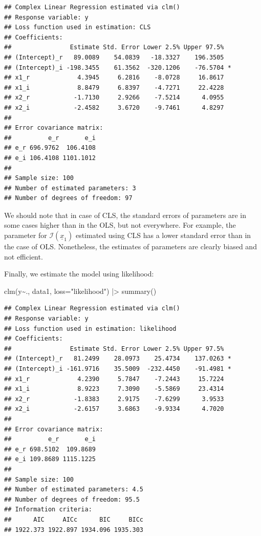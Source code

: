 \documentclass[
]{book}
\newenvironment{Shaded}{\begin{snugshade}}{\end{snugshade}}
\newcommand{\AttributeTok}[1]{\textcolor[rgb]{0.77,0.63,0.00}{#1}}
\newcommand{\FunctionTok}[1]{\textcolor[rgb]{0.00,0.00,0.00}{#1}}
\newcommand{\NormalTok}[1]{#1}
\newcommand{\SpecialCharTok}[1]{\textcolor[rgb]{0.00,0.00,0.00}{#1}}
\newcommand{\StringTok}[1]{\textcolor[rgb]{0.31,0.60,0.02}{#1}}
\begin{document}
\begin{verbatim}
## Complex Linear Regression estimated via clm()
## Response variable: y
## Loss function used in estimation: CLS
## Coefficients:
##                Estimate Std. Error Lower 2.5% Upper 97.5%  
## (Intercept)_r   89.0089    54.0839   -18.3327    196.3505  
## (Intercept)_i -198.3455    61.3562  -320.1206    -76.5704 *
## x1_r             4.3945     6.2816    -8.0728     16.8617  
## x1_i             8.8479     6.8397    -4.7271     22.4228  
## x2_r            -1.7130     2.9266    -7.5214      4.0955  
## x2_i            -2.4582     3.6720    -9.7461      4.8297  
## 
## Error covariance matrix:
##          e_r       e_i
## e_r 696.9762  106.4108
## e_i 106.4108 1101.1012
## 
## Sample size: 100
## Number of estimated parameters: 3
## Number of degrees of freedom: 97
\end{verbatim}

We should note that in case of CLS, the standard errors of parameters are in some cases higher than in the OLS, but not everywhere. For example, the parameter for \(\mathcal{I}\left(\underline{x}_{1}\right)\) estimated using CLS has a lower standard error than in the case of OLS. Nonetheless, the estimates of parameters are clearly biased and not efficient.

Finally, we estimate the model using likelihood:

\begin{Shaded}
\begin{Highlighting}[]
\FunctionTok{clm}\NormalTok{(y}\SpecialCharTok{\textasciitilde{}}\NormalTok{., data1, }\AttributeTok{loss=}\StringTok{"likelihood"}\NormalTok{) }\SpecialCharTok{|\textgreater{}}
    \FunctionTok{summary}\NormalTok{()}
\end{Highlighting}
\end{Shaded}

\begin{verbatim}
## Complex Linear Regression estimated via clm()
## Response variable: y
## Loss function used in estimation: likelihood
## Coefficients:
##                Estimate Std. Error Lower 2.5% Upper 97.5%  
## (Intercept)_r   81.2499    28.0973    25.4734    137.0263 *
## (Intercept)_i -161.9716    35.5009  -232.4450    -91.4981 *
## x1_r             4.2390     5.7847    -7.2443     15.7224  
## x1_i             8.9223     7.3090    -5.5869     23.4314  
## x2_r            -1.8383     2.9175    -7.6299      3.9533  
## x2_i            -2.6157     3.6863    -9.9334      4.7020  
## 
## Error covariance matrix:
##          e_r       e_i
## e_r 698.5102  109.8689
## e_i 109.8689 1115.1225
## 
## Sample size: 100
## Number of estimated parameters: 4.5
## Number of degrees of freedom: 95.5
## Information criteria:
##      AIC     AICc      BIC     BICc 
## 1922.373 1922.897 1934.096 1935.303
\end{verbatim}
\end{document}
